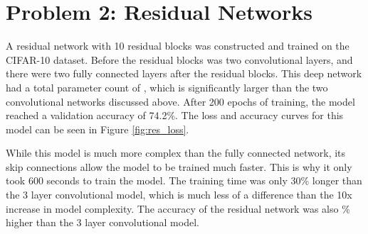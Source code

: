 \documentclass{article}
\begin{document}
\section{Problem 2: Residual Networks}
A residual network with 10 residual blocks was constructed and trained on the CIFAR-10 dataset. Before the residual blocks was two convolutional layers, and there were two fully connected layers after the residual blocks. This deep network had a total parameter count of , which is significantly larger than the two convolutional networks discussed above. After 200 epochs of training, the model reached a validation accuracy of 74.2\%. The loss and accuracy curves for this model can be seen in Figure \ref{fig:res_loss}.

While this model is much more complex than the fully connected network, its skip connections allow the model to be trained much faster. This is why it only took 600 seconds to train the model. The training time was only 30\% longer than the 3 layer convolutional model, which is much less of a difference than the 10x increase in model complexity. The accuracy of the residual network was also \% higher than the 3 layer convolutional model.
\end{document}
